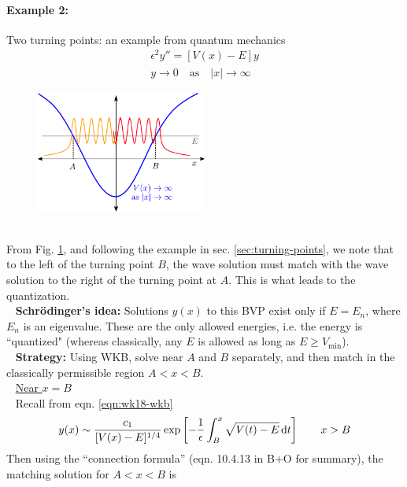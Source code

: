 \paragraph{Example 2:} Two turning points: an example from quantum mechanics
\begin{gather*}
	\epsilon^2 y'' = [V(x)-E]y \\
	y \rightarrow 0 \quad \text{as} \quad |x| \rightarrow \infty
\end{gather*}
\begin{figure}[!h]
	\centering
	\includegraphics[width=0.5\textwidth]{./plots/pdf/wkb-eigenvalue.pdf}
	\caption{}
	\label{fig:strogatz-wk20}
\end{figure}\\
From Fig. \ref{fig:strogatz-wk20}, and following the example in sec. \ref{sec:turning-points}, we note that to the left of the turning point $B$, the wave solution must match with the wave solution to the right of the turning point at $A$. This is what leads to the quantization. \\
\ \newline
{\bf Schr\"odinger's idea:} Solutions $y(x)$ to this BVP exist only if $E=E_n$, where $E_n$ is an eigenvalue. These are the only allowed energies, i.e. the energy is ``quantized" (whereas classically, any $E$ is allowed as long as $E \geq V_\text{min}$). \\ 
\ \newline
{\bf Strategy:} Using WKB, solve near $A$ and $B$ separately, and then match in the classically permissible region $A<x<B$. \\
\ \newline
\underline{Near $x=B$} \\
\ \newline 
Recall from eqn. \ref{eqn:wk18-wkb} 
\begin{gather*}
	y(x) \sim \frac{c_1}{[V(x)-E]^{1/4}} \exp \left[-\frac{1}{\epsilon} \int_{B}^{x} \sqrt{V(t)-E} \, \mathrm{d} t\right] \qquad x > B
\end{gather*}
Then using the ``connection formula'' (eqn. 10.4.13 in B+O for summary), the matching solution for $A<x<B$ is
